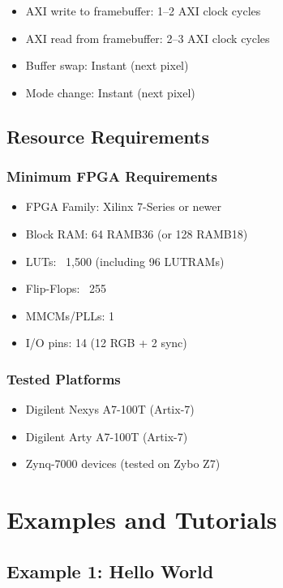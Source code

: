 \documentclass[11pt,letterpaper]{report}
\begin{document}
\begin{itemize}
    \item AXI write to framebuffer: 1--2 AXI clock cycles
    \item AXI read from framebuffer: 2--3 AXI clock cycles
    \item Buffer swap: Instant (next pixel)
    \item Mode change: Instant (next pixel)
\end{itemize}

\section{Resource Requirements}

\subsection{Minimum FPGA Requirements}

\begin{itemize}
    \item FPGA Family: Xilinx 7-Series or newer
    \item Block RAM: 64 RAMB36 (or 128 RAMB18)
    \item LUTs: ~1,500 (including 96 LUTRAMs)
    \item Flip-Flops: ~255
    \item MMCMs/PLLs: 1
    \item I/O pins: 14 (12 RGB + 2 sync)
\end{itemize}

\subsection{Tested Platforms}

\begin{itemize}
    \item Digilent Nexys A7-100T (Artix-7)
    \item Digilent Arty A7-100T (Artix-7)
    \item Zynq-7000 devices (tested on Zybo Z7)
\end{itemize}

\chapter{Examples and Tutorials}

\section{Example 1: Hello World}
\end{document}
